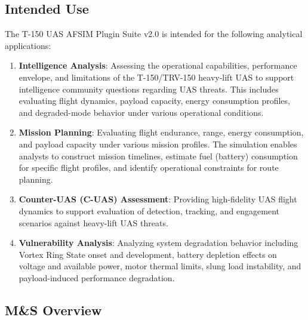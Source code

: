\documentclass[11pt, letterpaper]{article}
\begin{document}
\subsection{\unclass Intended Use}

\unclass The T-150 UAS AFSIM Plugin Suite v2.0 is intended for the following analytical applications:

\begin{enumerate}
    \item \unclass \textbf{Intelligence Analysis}: Assessing the operational capabilities, performance envelope, and limitations of the T-150/TRV-150 heavy-lift UAS to support intelligence community questions regarding UAS threats. This includes evaluating flight dynamics, payload capacity, energy consumption profiles, and degraded-mode behavior under various operational conditions.
    \item \unclass \textbf{Mission Planning}: Evaluating flight endurance, range, energy consumption, and payload capacity under various mission profiles. The simulation enables analysts to construct mission timelines, estimate fuel (battery) consumption for specific flight profiles, and identify operational constraints for route planning.
    \item \unclass \textbf{Counter-UAS (C-UAS) Assessment}: Providing high-fidelity UAS flight dynamics to support evaluation of detection, tracking, and engagement scenarios against heavy-lift UAS threats.
    \item \unclass \textbf{Vulnerability Analysis}: Analyzing system degradation behavior including Vortex Ring State onset and development, battery depletion effects on voltage and available power, motor thermal limits, slung load instability, and payload-induced performance degradation.
\end{enumerate}

\subsection{\unclass M\&S Overview}
\end{document}
